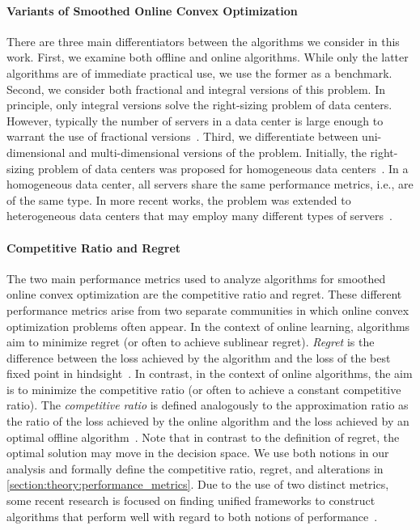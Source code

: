 \paragraph{Variants of Smoothed Online Convex Optimization} There are three main differentiators between the algorithms we consider in this work. First, we examine both offline and online algorithms. While only the latter algorithms are of immediate practical use, we use the former as a benchmark. Second, we consider both fractional and integral versions of this problem. In principle, only integral versions solve the right-sizing problem of data centers. However, typically the number of servers in a data center is large enough to warrant the use of fractional versions~\cite{Bansal2015}. Third, we differentiate between uni-dimensional and multi-dimensional versions of the problem. Initially, the right-sizing problem of data centers was proposed for homogeneous data centers~\cite{Lin2011, Bansal2015, Albers2018}. In a homogeneous data center, all servers share the same performance metrics, i.e., are of the same type. In more recent works, the problem was extended to heterogeneous data centers that may employ many different types of servers~\cite{Lin2012, Chen2018, Goel2019, Albers2021, Albers2021_2}.

\paragraph{Competitive Ratio and Regret} The two main performance metrics used to analyze algorithms for smoothed online convex optimization are the competitive ratio and regret. These different performance metrics arise from two separate communities in which online convex optimization problems often appear. In the context of online learning, algorithms aim to minimize regret (or often to achieve sublinear regret). \emph{Regret} is the difference between the loss achieved by the algorithm and the loss of the best fixed point in hindsight~\cite{Chen2018}. In contrast, in the context of online algorithms, the aim is to minimize the competitive ratio (or often to achieve a constant competitive ratio). The \emph{competitive ratio} is defined analogously to the approximation ratio as the ratio of the loss achieved by the online algorithm and the loss achieved by an optimal offline algorithm~\cite{Chen2018}. Note that in contrast to the definition of regret, the optimal solution may move in the decision space. We use both notions in our analysis and formally define the competitive ratio, regret, and alterations in \cref{section:theory:performance_metrics}. Due to the use of two distinct metrics, some recent research is focused on finding unified frameworks to construct algorithms that perform well with regard to both notions of performance~\cite{Chen2018, Goel2019}.

